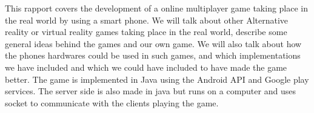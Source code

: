 This rapport covers the development of a online multiplayer game taking place in the real world by using a smart phone. We will talk about other Alternative reality or virtual reality games taking place in the real world, describe some general ideas behind the games and our own game. We will also talk about how the phones hardwares could be used in such games, and which implementations we have included and which we could have included to have made the game better. The game is implemented in Java using the Android API and Google play services. The server side is also made in java but runs on a computer and uses socket to communicate with the clients playing the game.






